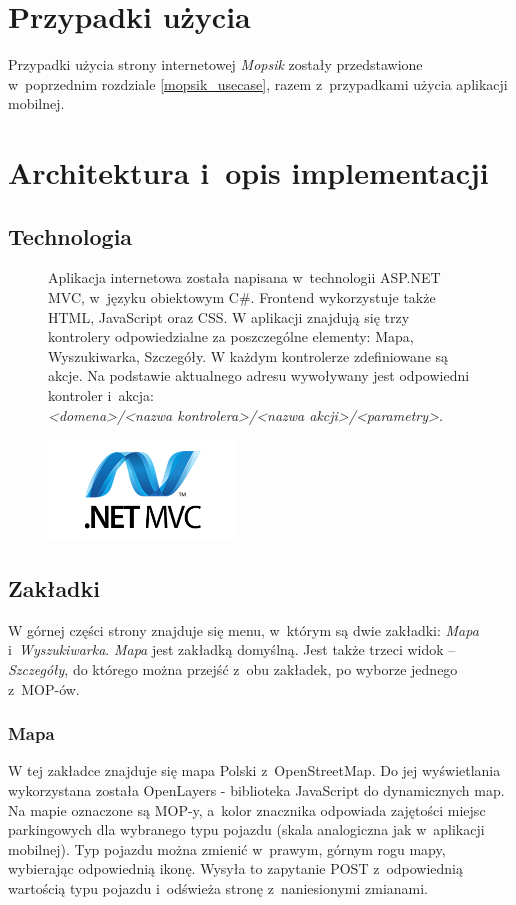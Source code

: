 \section{Przypadki użycia}
Przypadki użycia strony internetowej \textit{Mopsik} zostały przedstawione w~poprzednim rozdziale \ref{mopsik_usecase}, razem z~przypadkami użycia aplikacji mobilnej.

\section{Architektura i~opis implementacji}

\subsection{Technologia}
\begin{figure}[!htb]
    \centering
    \begin{minipage}{.7\textwidth}
Aplikacja internetowa została napisana w~technologii ASP.NET MVC, w~języku obiektowym C\#. Frontend wykorzystuje także HTML, JavaScript oraz CSS. W aplikacji znajdują się trzy kontrolery odpowiedzialne za poszczególne elementy: Mapa, Wyszukiwarka, Szczegóły. W każdym kontrolerze zdefiniowane są akcje. Na podstawie aktualnego adresu wywoływany jest odpowiedni kontroler i~akcja:\\ \textit{<domena>/<nazwa kontrolera>/<nazwa akcji>/<parametry>}.
    \end{minipage}%
    \begin{minipage}{.3\textwidth}
        \centering
        \includegraphics[width=5cm]{images/mvc.png}\label{MVC_logo}
    \end{minipage}
\end{figure}

\subsection{Zakładki}
W górnej części strony znajduje się menu, w~którym są dwie zakładki: \textit{Mapa} i~\textit{Wyszukiwarka}. \textit{Mapa} jest zakładką domyślną. Jest także trzeci widok -- \textit{Szczegóły}, do którego można przejść z~obu zakładek, po wyborze jednego z~MOP-ów.
\subsubsection{Mapa}
W tej zakładce znajduje się mapa Polski z~OpenStreetMap\cite{osm}. Do jej wyświetlania wykorzystana została OpenLayers - biblioteka JavaScript do dynamicznych map. Na mapie oznaczone są MOP-y, a~kolor znacznika odpowiada zajętości miejsc parkingowych dla wybranego typu pojazdu (skala analogiczna jak w~aplikacji mobilnej). Typ pojazdu można zmienić w~prawym, górnym rogu mapy, wybierając odpowiednią ikonę. Wysyła to zapytanie POST z~odpowiednią wartością typu pojazdu i~odświeża stronę z~naniesionymi zmianami. 

